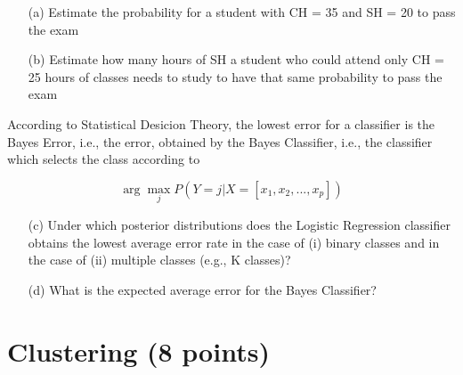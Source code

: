 \documentclass[a4paper,12pt,titlepage]{article} %
\begin{document}
\begin{itemize}
\item[(a)] Estimate the probability for a student with CH = 35 and SH = 20 to pass the exam
\item[(b)] Estimate how many hours of SH a student who could attend only CH = 25 hours of classes needs to study to have that same probability to pass the exam
\end{itemize}

According to Statistical Desicion Theory, the lowest error for a classifier is the Bayes Error, i.e., the error, obtained by the Bayes Classifier, i.e., the classifier which selects the class according to 

$$ \arg \max_{j} P (Y = j | X = [x_{1}, x_{2}, ..., x_{p}]) $$

\begin{itemize}
\item[(c)] Under which posterior distributions does the Logistic Regression classifier obtains the lowest average error rate in the case of (i) binary classes and in the case of (ii) multiple classes (e.g., K classes)?
\item[(d)] What is the expected average error for the Bayes Classifier? 
\end{itemize}

\newpage
\section{Clustering (8 points)}
\end{document}
